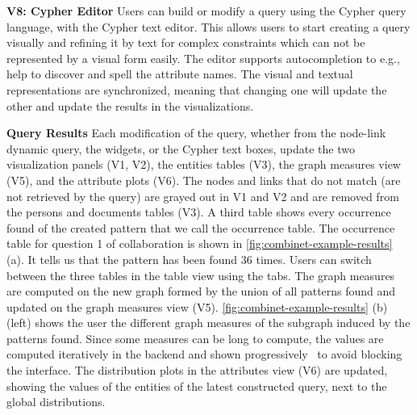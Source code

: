 \noindent\textbf{V8: Cypher Editor}
Users can build or modify a query using the Cypher query language, with the Cypher text editor.
This allows users to start creating a query visually and refining it by text for complex constraints which can not be represented by a visual form easily.
The editor supports autocompletion to e.g., help to discover and spell the attribute names.
The visual and textual representations are synchronized, meaning that changing one will update the other and update the results in the visualizations.


\noindent\textbf{Query Results}
Each modification of the query, whether from the node-link dynamic query, the widgets, or the Cypher text boxes, update the two visualization panels (V1, V2), the entities tables (V3), the graph measures view (V5), and the attribute plots (V6).
The nodes and links that do not match (are not retrieved by the query) are grayed out in V1 and V2 and are removed from the persons and documents tables (V3).
A third table shows every occurrence found of the created pattern that we call the occurrence table.
The occurrence table for question 1 of collaboration \pascal is shown in \autoref{fig:combinet-example-results} (a).
It tells us that the pattern has been found 36 times.
Users can switch between the three tables in the table view using the tabs.
The graph measures are computed on the new graph formed by the union of all patterns found and updated on the graph measures view (V5).
\autoref{fig:combinet-example-results} (b) (left) shows the user the different graph measures of the subgraph induced by the patterns found.
Since some measures can be long to compute, the values are computed iteratively in the backend and shown progressively~\cite{feketeProgressiveDataAnalysis2019} to avoid blocking the interface.
The distribution plots in the attributes view (V6) are updated, showing the values of the entities of the latest constructed query, next to the global distributions.


